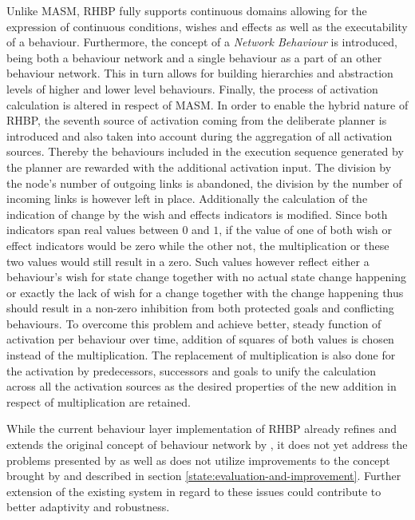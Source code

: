 Unlike MASM, RHBP fully supports continuous domains allowing for the expression of continuous conditions, wishes and effects as well as the executability of a behaviour. Furthermore, the concept of a \textit{Network Behaviour} is introduced, being both a behaviour network and a single behaviour as a part of an other behaviour network. This in turn allows for building hierarchies and abstraction levels of higher and lower level behaviours. Finally, the process of activation calculation is altered in respect of MASM. In order to enable the hybrid nature of RHBP, the seventh source of activation coming from the deliberate planner is introduced and also taken into account during the aggregation of all activation sources. Thereby the behaviours included in the execution sequence generated by the planner are rewarded with the additional activation input. The division by the node's number of outgoing links is abandoned, the division by the number of incoming links is however left in place. Additionally the calculation of the indication of change by the wish and effects indicators is modified. Since both indicators span real values between $0$ and $1$, if the value of one of both wish or effect indicators would be zero while the other not, the multiplication or these two values would still result in a zero. Such values however reflect either a behaviour's wish for state change together with no actual state change happening or exactly the lack of wish for a change together with the change happening thus should result in a non-zero inhibition from both protected goals and conflicting behaviours. To overcome this problem and achieve better, steady function of activation  per behaviour over time, addition of squares of both values is chosen instead of the multiplication. The replacement of multiplication is also done for the activation by predecessors, successors and goals to unify the calculation across all the activation sources as the desired properties of the new addition in respect of multiplication  are retained. \par
While the current behaviour layer implementation of RHBP already refines and extends the original concept of behaviour network by \cite{maes}, it does not yet address the problems presented by \cite{tyrrell} as well as does not utilize improvements to the concept brought by \cite{dorer} and  described in section \ref{state:evaluation-and-improvement}. Further extension of the existing system in regard to these issues could contribute to better adaptivity and robustness.

